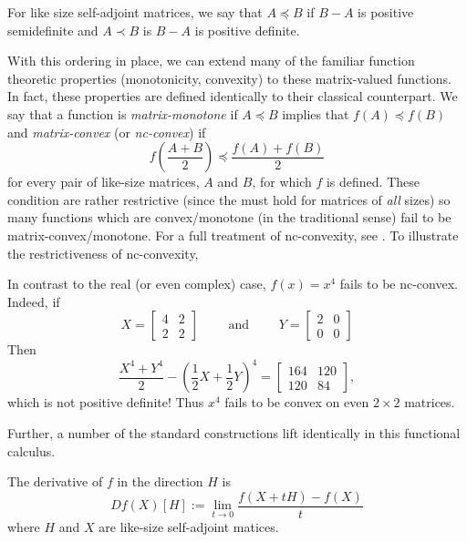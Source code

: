 \begin{definition}
\label{def:LoewnerOrder}
  For like size self-adjoint matrices, we say that \(A \preceq B\) if \(B - A \)
  is positive semidefinite and \(A \prec B\) is \(B-A\) is positive definite.
\end{definition}

With this ordering in place, we can extend many of the familiar function
theoretic properties (monotonicity, convexity) to these matrix-valued functions.
In fact, these properties are defined identically to their classical counterpart.
We say that a function is \emph{matrix-monotone} if \(A \preceq B\) implies that
\(f(A) \preceq f(B)\) and \emph{matrix-convex} (or \emph{nc-convex}) if
\[
  f \left( \frac{A+B}{2} \right) \preceq \frac{f(A)+f(B)}{2}
\]
for every pair of like-size matrices, \(A\) and \(B\), for which \(f\) is defined. These condition
are rather restrictive (since the must hold for matrices of \emph{all} sizes) so
many functions which are convex/monotone (in the traditional sense) fail to be
matrix-convex/monotone. For a full treatment of nc-convexity, see
\cite{heltonFree2013}. To illustrate the restrictiveness of nc-convexity,
\begin{example}%
\label{ex:helton1}
  In contrast to the real (or even complex) case, \(f(x)=x^4\) fails to be nc-convex.
  Indeed, if
  \[
    X = \begin{bmatrix} 4 &2\\2&2 \end{bmatrix}  \qquad \text{ and } \qquad Y =\begin{bmatrix} 2&0\\0&0 \end{bmatrix}
  \]
  Then
  \[
    \frac{X^4+Y^4}{2} - \left( \frac{1}{2}X +\frac{1}{2}Y \right) ^4
    = \begin{bmatrix} 164 &120\\120&84 \end{bmatrix},
  \]
  which is not positive definite! Thus \(x^4\) fails to be convex on even
  \(2\times 2\) matrices.
\end{example}

Further, a number of the standard constructions lift identically in this
functional calculus.
\begin{definition}
  \label{def:DirDeriv}
  The derivative of \(f\) in the direction \(H\) is
  \[
    Df(X)[H] := \lim_{t \to 0} \frac{f(X+tH) - f(X)}{t}
  \]
  where \(H\) and \(X\) are like-size self-adjoint matices.
\end{definition}

